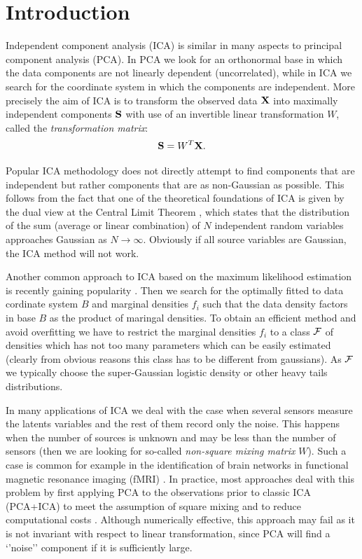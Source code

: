 \section{Introduction}
\label{introduction}

Independent component analysis (ICA) is similar in many aspects to principal component analysis (PCA). In PCA we look for an orthonormal base in which the data components are not
linearly dependent (uncorrelated), while in 
ICA we search for the coordinate system in which the components are independent. More precisely the aim of ICA is to transform the observed data $\X$ into maximally independent components $\S$ with use of an invertible linear transformation $W$, called the {\em transformation matrix}: $$
\S = W^T \X.
$$

Popular ICA methodology does not directly attempt to find components that are independent but rather components that are as non-Gaussian as possible.
This follows from the fact that one of the theoretical foundations of ICA is given by the dual view at the Central Limit Theorem \cite{hyvarinen2000independent}, which states that the distribution of the sum (average or linear combination) of $N$ independent random variables approaches Gaussian as  $N\rightarrow \infty$. Obviously if all source variables are Gaussian, the ICA method will not work. 

Another common approach to ICA based on the maximum likelihood estimation~\cite{pham1997blind} is recently gaining popularity \cite{hyvarinen2004independent,samworth2012independent,ICA2017pattern}.  Then we search for the optimally fitted to data cordinate system $B$ and marginal
densities $f_i$ such that the data density factors in base $B$ as the product of maringal densities. To obtain an efficient method and avoid 
overfitting we have to restrict the marginal densities $f_i$ to a class $\F$ of densities which has not too many parameters which can be easily estimated (clearly from obvious reasons this class has to be different from gaussians).  As $\F$ we typically choose the super-Gaussian logistic density or other heavy tails distributions.

In many applications of ICA we deal with the case when several sensors measure the latents variables and the rest of them record only the noise. This happens when the number of sources is unknown and may be less than the number of sensors (then we are looking for so-called {\em non-square mixing matrix} $W$).
Such a case is common for example in the identification of brain networks
in functional  magnetic resonance imaging (fMRI) 
\cite{beckmann2012modelling,green2002pca}.
In practice, most approaches deal with this problem by first applying PCA to the observations prior to classic ICA (PCA+ICA) to meet the assumption of square mixing and to reduce computational costs \cite{hyvarinen2004independent}. Although numerically effective, this approach may fail as it is not invariant with respect to linear transformation, since PCA will find a `'noise'' component if
it is sufficiently large. 

